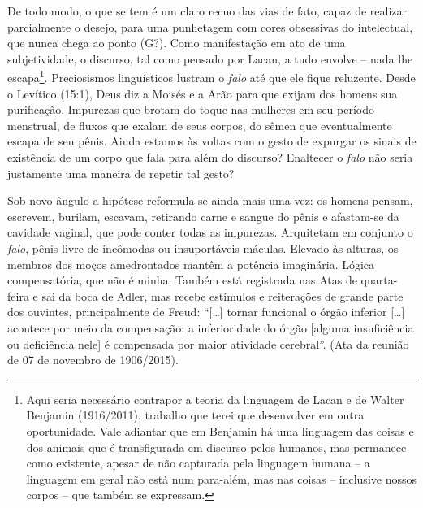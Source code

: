 De todo modo, o que se tem é um claro recuo das vias de fato, capaz de
realizar parcialmente o desejo, para uma punhetagem com cores obsessivas
do intelectual, que nunca chega ao ponto (G?). Como manifestação em ato
de uma subjetividade, o discurso, tal como pensado por Lacan, a tudo
envolve -- nada lhe escapa\footnote{Aqui seria necessário contrapor a
  teoria da linguagem de Lacan e de Walter Benjamin (1916/2011),
  trabalho que terei que desenvolver em outra oportunidade. Vale
  adiantar que em Benjamin há uma linguagem das coisas e dos animais que
  é transfigurada em discurso pelos humanos, mas permanece como
  existente, apesar de não capturada pela linguagem humana -- a
  linguagem em geral não está num para-além, mas nas coisas -- inclusive
  nossos corpos -- que também se expressam.}. Preciosismos linguísticos
lustram o \emph{falo} até que ele fique reluzente. Desde o Levítico
(15:1), Deus diz a Moisés e a Arão para que exijam dos homens sua
purificação. Impurezas que brotam do toque nas mulheres em seu período
menstrual, de fluxos que exalam de seus corpos, do sêmen que
eventualmente escapa de seu pênis. Ainda estamos às voltas com o gesto
de expurgar os sinais de existência de um corpo que fala para além do
discurso? Enaltecer o \emph{falo} não seria justamente uma maneira de
repetir tal gesto?

Sob novo ângulo a hipótese reformula-se ainda mais uma vez: os homens
pensam, escrevem, burilam, escavam, retirando carne e sangue do pênis e
afastam-se da cavidade vaginal, que pode conter todas as impurezas.
Arquitetam em conjunto o \emph{falo}, pênis livre de incômodas ou
insuportáveis máculas. Elevado às alturas, os membros dos moços
amedrontados mantêm a potência imaginária. Lógica compensatória, que não
é minha. Também está registrada nas Atas de quarta-feira e sai da boca
de Adler, mas recebe estímulos e reiterações de grande parte dos
ouvintes, principalmente de Freud: ``{[}\ldots{}{]} tornar funcional o órgão
inferior {[}\ldots{}{]} acontece por meio da compensação: a inferioridade do
órgão {[}alguma insuficiência ou deficiência nele{]} é compensada por
maior atividade cerebral''. (Ata da reunião de 07 de novembro de
1906/2015).

